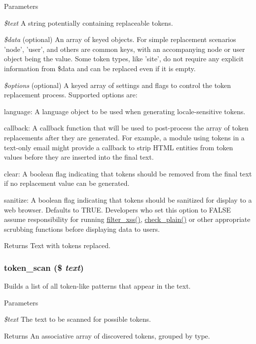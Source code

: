 \begin{DoxyParams}{Parameters}
\item[{\em \$text}]A string potentially containing replaceable tokens. \item[{\em \$data}](optional) An array of keyed objects. For simple replacement scenarios 'node', 'user', and others are common keys, with an accompanying node or user object being the value. Some token types, like 'site', do not require any explicit information from \$data and can be replaced even if it is empty. \item[{\em \$options}](optional) A keyed array of settings and flags to control the token replacement process. Supported options are:
\begin{DoxyItemize}
\item language: A language object to be used when generating locale-\/sensitive tokens.
\item callback: A callback function that will be used to post-\/process the array of token replacements after they are generated. For example, a module using tokens in a text-\/only email might provide a callback to strip HTML entities from token values before they are inserted into the final text.
\item clear: A boolean flag indicating that tokens should be removed from the final text if no replacement value can be generated.
\item sanitize: A boolean flag indicating that tokens should be sanitized for display to a web browser. Defaults to TRUE. Developers who set this option to FALSE assume responsibility for running \hyperlink{group__sanitization_ga8864a29ffa8de5c9f8dc9e417060660d}{filter\_\-xss()}, \hyperlink{group__sanitization_ga76fc67a30fd8d75ddd80565e6e65a13d}{check\_\-plain()} or other appropriate scrubbing functions before displaying data to users.
\end{DoxyItemize}\end{DoxyParams}
\begin{DoxyReturn}{Returns}
Text with tokens replaced. 
\end{DoxyReturn}
\hypertarget{includes_2token_8inc_a0672a1031161b81dd5aff4476bbc1c99}{
\subsubsection[{token\_\-scan}]{\setlength{\rightskip}{0pt plus 5cm}token\_\-scan (\$ {\em text})}}
\label{includes_2token_8inc_a0672a1031161b81dd5aff4476bbc1c99}
Builds a list of all token-\/like patterns that appear in the text.


\begin{DoxyParams}{Parameters}
\item[{\em \$text}]The text to be scanned for possible tokens.\end{DoxyParams}
\begin{DoxyReturn}{Returns}
An associative array of discovered tokens, grouped by type. 
\end{DoxyReturn}
